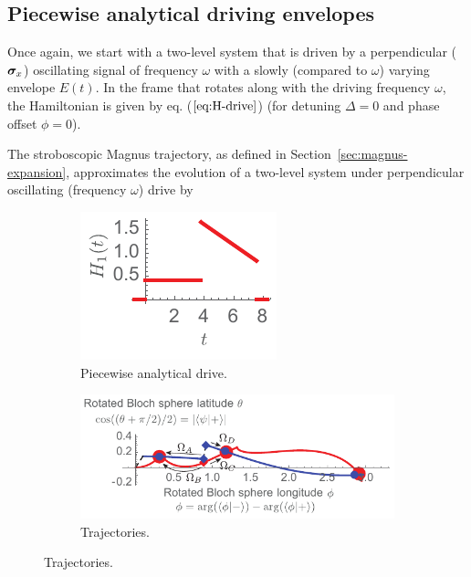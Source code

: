 \subsection{Piecewise analytical driving envelopes}
Once again, we start with a two-level system that is driven by a perpendicular ($\bm{\sigma}_x$) oscillating signal of frequency $\omega$ with a slowly (compared to $\omega$) varying envelope $E(t)$. In the frame that rotates along with the driving frequency $\omega$, the Hamiltonian is given by eq. ($\ref{eq:H-drive}$) (for detuning $\Delta = 0$ and phase offset $\phi=0$). 


The stroboscopic Magnus trajectory, as defined in Section~\ref{sec:magnus-expansion}, approximates the evolution of a two-level system under perpendicular oscillating (frequency $\omega$) drive by 

\begin{figure}[tb]
	\centering
	\begin{subfigure}[b]{0.3\linewidth}
		\centering
		\includegraphics[scale=1]{figures/jumpop_drive.pdf}
		\caption{\label{fig:jumpop-trace:drive}Piecewise analytical drive.}
	\end{subfigure}%
	\begin{subfigure}[b]{0.7\linewidth}
		\centering
		\includegraphics[scale=1]{figures/jumpop_trace.pdf}
		\caption{\label{fig:jumpop-trace:trajectory}Trajectories.}
	\end{subfigure}%

\end{figure}
